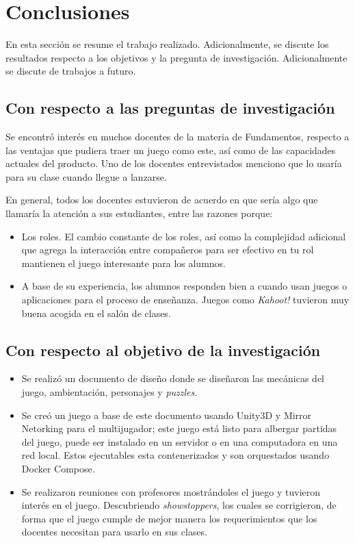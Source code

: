 \chapter{Conclusiones}\label{conclusiones}
 
 En esta sección se resume el trabajo realizado. Adicionalmente, se discute los resultados respecto a los objetivos y la pregunta de investigación. Adicionalmente se discute de trabajos a futuro.
 
\section{Con respecto a las preguntas de investigación}

Se encontró interés en muchos docentes de la materia de Fundamentos, respecto a las ventajas que pudiera traer un juego como este, así como de las capacidades actuales del producto. Uno de los docentes entrevistados menciono que lo usaría para su clase cuando llegue a lanzarse. 

En general, todos los docentes estuvieron de acuerdo en que sería algo que llamaría la atención a sus estudiantes, entre las razones porque:
\begin{itemize}
    \item Los roles. El cambio constante de los roles, así como la complejidad adicional que agrega la interacción entre compañeros para ser efectivo en tu rol mantienen el juego interesante para los alumnos.
    \item A base de su experiencia, los alumnos responden bien a cuando usan juegos o aplicaciones para el proceso de enseñanza. Juegos como \textit{Kahoot!} tuvieron muy buena acogida  en el salón de clases.
\end{itemize}

\section{Con respecto al objetivo de la investigación}
\begin{itemize}
    \item Se realizó un documento de diseño donde se diseñaron las mecánicas del juego, ambientación, personajes y \textit{puzzles}.
    \item Se creó un juego a base de este documento usando Unity3D y Mirror Netorking para el multijugador; este juego está listo para albergar partidas del juego, puede ser instalado en un servidor o en una computadora en una red local. Estos ejecutables esta contenerizados y son orquestados usando Docker Compose.
    \item Se realizaron reuniones con profesores mostrándoles el juego y tuvieron interés en el juego. Descubriendo \textit{showstoppers}, los cuales se corrigieron, de forma que el juego cumple de mejor manera los requerimientos que los docentes necesitan para usarlo en sus clases.
\end{itemize}

